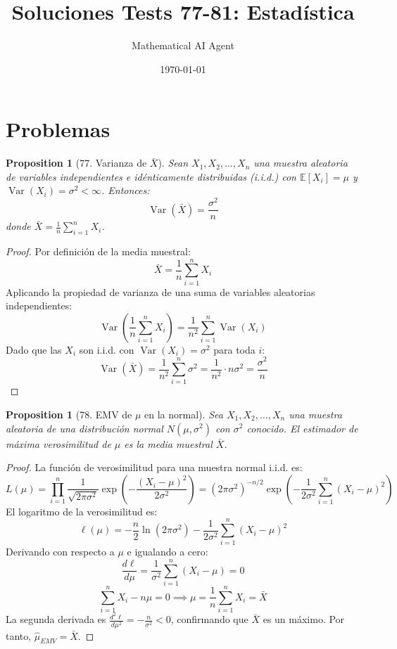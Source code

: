 \documentclass[11pt,a4paper]{article}
\title{Soluciones Tests 77-81: Estadística}
\author{Mathematical AI Agent}
\date{\today}
\theoremstyle{plain}
\newtheorem{proposition}[theorem]{Proposition}
\theoremstyle{definition}
\begin{document}
\maketitle

\section{Problemas}

\begin{proposition}[77. Varianza de $\bar{X}$]
Sean $X_1, X_2, \ldots, X_n$ una muestra aleatoria de variables independientes e idénticamente distribuidas (i.i.d.) con $\mathbb{E}[X_i] = \mu$ y $\operatorname{Var}(X_i) = \sigma^2 < \infty$. Entonces:
\[
\operatorname{Var}(\bar{X}) = \frac{\sigma^2}{n}
\]
donde $\bar{X} = \frac{1}{n}\sum_{i=1}^n X_i$.
\end{proposition}

\begin{proof}
Por definición de la media muestral:
\[
\bar{X} = \frac{1}{n}\sum_{i=1}^n X_i
\]
Aplicando la propiedad de varianza de una suma de variables aleatorias independientes:
\[
\operatorname{Var}\left(\frac{1}{n}\sum_{i=1}^n X_i\right) = \frac{1}{n^2}\sum_{i=1}^n \operatorname{Var}(X_i)
\]
Dado que las $X_i$ son i.i.d. con $\operatorname{Var}(X_i) = \sigma^2$ para toda $i$:
\[
\operatorname{Var}(\bar{X}) = \frac{1}{n^2}\sum_{i=1}^n \sigma^2 = \frac{1}{n^2} \cdot n\sigma^2 = \frac{\sigma^2}{n}
\]
\end{proof}

\begin{proposition}[78. EMV de $\mu$ en la normal]
Sea $X_1, X_2, \ldots, X_n$ una muestra aleatoria de una distribución normal $N(\mu, \sigma^2)$ con $\sigma^2$ conocido. El estimador de máxima verosimilitud de $\mu$ es la media muestral $\bar{X}$.
\end{proposition}

\begin{proof}
La función de verosimilitud para una muestra normal i.i.d. es:
\[
L(\mu) = \prod_{i=1}^n \frac{1}{\sqrt{2\pi\sigma^2}} \exp\left(-\frac{(X_i - \mu)^2}{2\sigma^2}\right) = (2\pi\sigma^2)^{-n/2} \exp\left(-\frac{1}{2\sigma^2}\sum_{i=1}^n (X_i - \mu)^2\right)
\]
El logaritmo de la verosimilitud es:
\[
\ell(\mu) = -\frac{n}{2}\ln(2\pi\sigma^2) - \frac{1}{2\sigma^2}\sum_{i=1}^n (X_i - \mu)^2
\]
Derivando con respecto a $\mu$ e igualando a cero:
\[
\frac{d\ell}{d\mu} = \frac{1}{\sigma^2}\sum_{i=1}^n (X_i - \mu) = 0
\]
\[
\sum_{i=1}^n X_i - n\mu = 0 \implies \mu = \frac{1}{n}\sum_{i=1}^n X_i = \bar{X}
\]
La segunda derivada es $\frac{d^2\ell}{d\mu^2} = -\frac{n}{\sigma^2} < 0$, confirmando que $\bar{X}$ es un máximo. Por tanto, $\hat{\mu}_{EMV} = \bar{X}$.
\end{proof}
\end{document}

